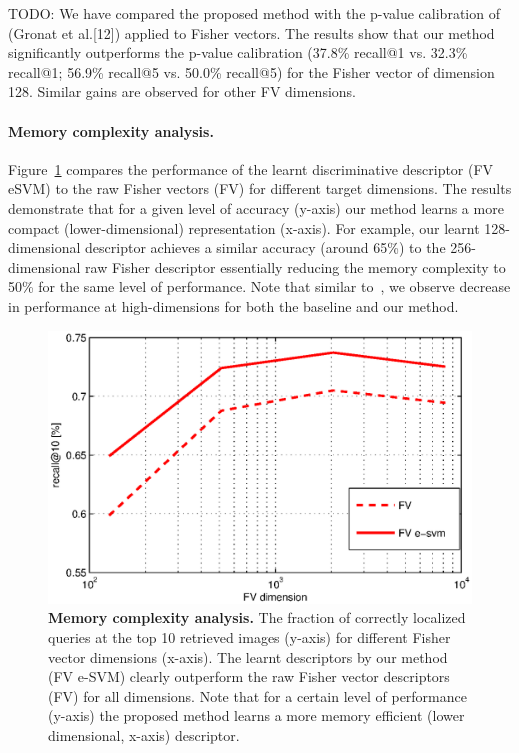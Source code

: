 \documentclass[10pt,twocolumn,letterpaper]{article}
\begin{document}
        \textcolor{petr}{ TODO:
          We have compared the proposed method with the p-value calibration of (Gronat et al.[12]) applied to Fisher vectors. The results show that our method significantly outperforms the p-value calibration (37.8\% recall@1 vs. 32.3\% recall@1; 56.9\% recall@5 vs. 50.0\% recall@5) for the Fisher vector of dimension 128. Similar gains are observed for other FV dimensions.
        }
      \paragraph{Memory complexity analysis.}
         Figure~\ref{fig:memory} compares the performance of the learnt discriminative descriptor (FV eSVM) to the raw Fisher vectors (FV) for different target dimensions. 
         The results demonstrate that for a given level of accuracy (y-axis) our method learns a more compact (lower-dimensional) representation (x-axis). For example, our learnt 128-dimensional descriptor achieves a similar accuracy (around 65\%) to the 256-dimensional raw Fisher descriptor essentially reducing the memory complexity to 50\% for the same level of performance.  Note that 
         similar to~\cite{Jegou12}, we observe decrease in performance at high-dimensions for both the baseline and our method.
         \begin{figure}[t!]
            \centering
            \includegraphics[width=1.0\linewidth]{imgs/FVmemory}    
            \caption{
               \textbf{Memory complexity analysis.} 
               The fraction of correctly localized queries at the top 10 retrieved images (y-axis) for different Fisher vector dimensions (x-axis). The learnt descriptors by our method (FV e-SVM) clearly outperform the raw Fisher vector descriptors (FV) for all dimensions. Note that for a certain level of performance (y-axis) the proposed method learns a more memory efficient (lower dimensional, x-axis) descriptor.
            }
            \label{fig:memory}
         \end{figure}
\end{document}
